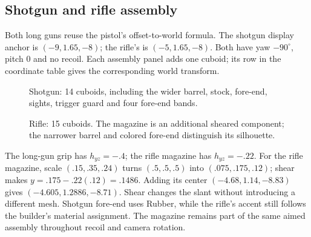 \subsection{Shotgun and rifle assembly}
Both long guns reuse the pistol's offset-to-world formula. The shotgun display anchor is $(-9,1.65,-8)$; the rifle's is $(-5,1.65,-8)$. Both have yaw $-90^\circ$, pitch 0 and no recoil. Each assembly panel adds one cuboid; its row in the coordinate table gives the corresponding world transform.
\begin{figure}[htbp]

\caption{Shotgun: 14 cuboids, including the wider barrel, stock, fore-end, sights, trigger guard and four fore-end bands.}
\end{figure}

\begin{figure}[htbp]

\caption{Rifle: 15 cuboids. The magazine is an additional sheared component; the narrower barrel and colored fore-end distinguish its silhouette.}
\end{figure}

The long-gun grip has $h_{yz}=-.4$; the rifle magazine has $h_{yz}=-.22$. For the rifle magazine, scale $(.15,.35,.24)$ turns $(.5,.5,.5)$ into $(.075,.175,.12)$; shear makes $y=.175-.22(.12)=.1486$. Adding its center $(-4.68,1.14,-8.83)$ gives $(-4.605,1.2886,-8.71)$. Shear changes the slant without introducing a different mesh. Shotgun fore-end uses Rubber, while the rifle's accent still follows the builder's material assignment. The magazine remains part of the same aimed assembly throughout recoil and camera rotation.

